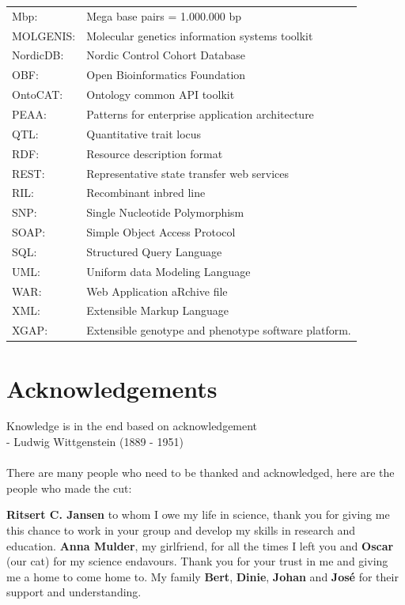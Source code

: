 {\begin{tabular}{ l l }
Mbp:         & Mega base pairs = 1.000.000 bp \\
MOLGENIS:    & Molecular genetics information systems toolkit\\
NordicDB:    & Nordic Control Cohort Database\\
OBF:         & Open Bioinformatics Foundation\\
OntoCAT:     & Ontology common API toolkit\\
PEAA:        & Patterns for enterprise application architecture\\
QTL:         & Quantitative trait locus\\
RDF:         & Resource description format\\
REST:        & Representative state transfer web services\\
RIL:         & Recombinant inbred line \\
SNP:         & Single Nucleotide Polymorphism\\
SOAP:        & Simple Object Access Protocol\\
SQL:         & Structured Query Language\\
UML:         & Uniform data Modeling Language\\
WAR:         & Web Application aRchive file\\
XML:         & Extensible Markup Language\\
XGAP:        & Extensible genotype and phenotype software platform. 
\end{tabular}
}
\newpage

\section{Acknowledgements}
Knowledge is in the end based on acknowledgement\\
- Ludwig Wittgenstein (1889 - 1951)\\\\

There are many people who need to be thanked and acknowledged, 
here are the people who made the cut:

{\bf Ritsert C. Jansen} to whom I owe my life in science, thank you for giving me this chance 
to work in your group and develop my skills in research and education. {\bf Anna Mulder}, my 
girlfriend, for all the times I left you and {\bf Oscar} (our cat) for my science endavours. 
Thank you for your trust in me and giving me a home to come home to.
My family {\bf Bert}, {\bf Dinie}, {\bf Johan} and {\bf Jos\'{e}} for their support and understanding. 

